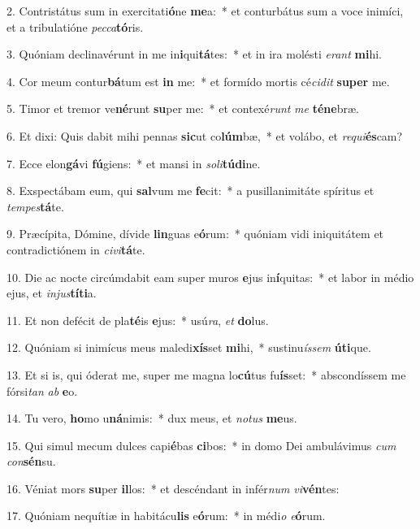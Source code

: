2. Contristátus sum in exercitati\textbf{ó}ne \textbf{me}a:~*  et conturbátus sum a voce inimíci, et a tribulatióne \textit{pec}\textit{ca}\textbf{tó}ris.\

3. Quóniam declinavérunt in me in\textbf{i}qui\textbf{tá}tes:~*  et in ira molésti \textit{e}\textit{rant} \textbf{mi}hi.\

4. Cor meum contur\textbf{bá}tum est \textbf{in} me:~*  et formído mortis cé\textit{ci}\textit{dit} \textbf{su}\textbf{per} me.\

5. Timor et tremor ve\textbf{né}runt \textbf{su}per me:~*  et contexé\textit{runt} \textit{me} \textbf{té}\textbf{ne}bræ.\

6. Et dixi: Quis dabit mihi pennas \textbf{sic}ut co\textbf{lúm}bæ,~*  et volábo, et \textit{re}\textit{qui}\textbf{és}cam?\

7. Ecce elon\textbf{gá}vi \textbf{fú}giens:~*  et mansi in \textit{so}\textit{li}\textbf{tú}\textbf{di}ne.\

8. Exspectábam eum, qui \textbf{sal}vum me \textbf{fe}cit:~*  a pusillanimitáte spíritus et \textit{tem}\textit{pes}\textbf{tá}te.\

9. Præcípita, Dómine, dívide \textbf{lin}guas e\textbf{ó}rum:~*  quóniam vidi iniquitátem et contradictiónem in \textit{ci}\textit{vi}\textbf{tá}te.\

10. Die ac nocte circúmdabit eam super muros \textbf{e}jus in\textbf{í}quitas:~*  et labor in médio ejus, et \textit{in}\textit{jus}\textbf{tí}\textbf{ti}a.\

11. Et non defécit de pla\textbf{té}is \textbf{e}jus:~*  usú\textit{ra}, \textit{et} \textbf{do}lus.\

12. Quóniam si inimícus meus maledi\textbf{xís}set \textbf{mi}hi,~*  sustinu\textit{ís}\textit{sem} \textbf{ú}\textbf{ti}que.\

13. Et si is, qui óderat me, super me magna lo\textbf{cú}tus fu\textbf{ís}set:~*  abscondíssem me fórsi\textit{tan} \textit{ab} \textbf{e}o.\

14. Tu vero, \textbf{ho}mo u\textbf{ná}nimis:~*  dux meus, et \textit{no}\textit{tus} \textbf{me}us.\

15. Qui simul mecum dulces capi\textbf{é}bas \textbf{ci}bos:~*  in domo Dei ambulávimus \textit{cum} \textit{con}\textbf{sén}su.\

16. Véniat mors \textbf{su}per \textbf{il}los:~*  et descéndant in infér\textit{num} \textit{vi}\textbf{vén}tes:\

17. Quóniam nequítiæ in habitácu\textbf{lis} e\textbf{ó}rum:~*  in médi\textit{o} \textit{e}\textbf{ó}rum.\

